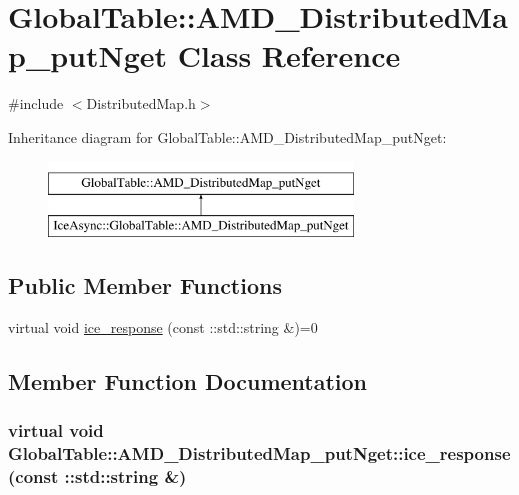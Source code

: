 \hypertarget{class_global_table_1_1_a_m_d___distributed_map__put_nget}{
\section{GlobalTable::AMD\_\-DistributedMap\_\-putNget Class Reference}
\label{class_global_table_1_1_a_m_d___distributed_map__put_nget}
}


{\ttfamily \#include $<$DistributedMap.h$>$}

Inheritance diagram for GlobalTable::AMD\_\-DistributedMap\_\-putNget:\begin{figure}[H]
\begin{center}
\leavevmode
\includegraphics[height=2cm]{class_global_table_1_1_a_m_d___distributed_map__put_nget}
\end{center}
\end{figure}
\subsection*{Public Member Functions}
\begin{DoxyCompactItemize}
\item 
virtual void \hyperlink{class_global_table_1_1_a_m_d___distributed_map__put_nget_a502958a18fdd4eceabd8fb92d42e676d}{ice\_\-response} (const ::std::string \&)=0
\end{DoxyCompactItemize}


\subsection{Member Function Documentation}
\hypertarget{class_global_table_1_1_a_m_d___distributed_map__put_nget_a502958a18fdd4eceabd8fb92d42e676d}{
\subsubsection[{ice\_\-response}]{\setlength{\rightskip}{0pt plus 5cm}virtual void GlobalTable::AMD\_\-DistributedMap\_\-putNget::ice\_\-response (const ::std::string \&)}}
\label{class_global_table_1_1_a_m_d___distributed_map__put_nget_a502958a18fdd4eceabd8fb92d42e676d}


